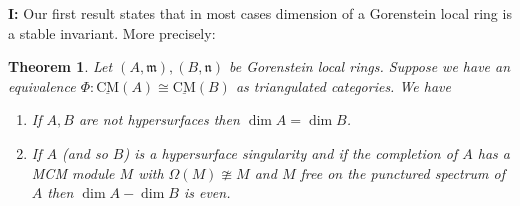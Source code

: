 \documentclass{amsart}
\newcommand{\n}{\mathfrak{n} }
\newcommand{\m}{\mathfrak{m} }
\newcommand{\CMS}{\operatorname{\underline{CM}}}
\theoremstyle{plain}
\newtheorem{theorem}{Theorem}[section]
\theoremstyle{definition}
\theoremstyle{remark}
\begin{document}
\textbf{I:} Our first result states that in most cases dimension of a Gorenstein local ring is a stable invariant. More precisely:
\begin{theorem}
\label{first}
Let $(A,\m), (B,\n) $ be  Gorenstein local rings. Suppose we have an equivalence $\Phi \colon \CMS(A) \cong \CMS(B)$ as triangulated categories. We have
\begin{enumerate}[\rm (1)]
  \item If $A, B$ are not hypersurfaces then $\dim A = \dim B$.
  \item  If $A$ (and so $B$)  is a hypersurface  singularity and if the completion of $A$ has a MCM module $M$ with $\Omega(M) \ncong M$  and $M$ free on the punctured spectrum of $A$ then $\dim A - \dim B$ is even.
 \end{enumerate}
\end{theorem}
\end{document}
